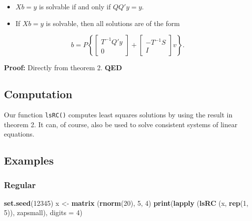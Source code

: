 \documentclass[12pt,]{article}
\newenvironment{Shaded}{\begin{snugshade}}{\end{snugshade}}
\newcommand{\KeywordTok}[1]{\textcolor[rgb]{0.13,0.29,0.53}{\textbf{#1}}}
\newcommand{\DataTypeTok}[1]{\textcolor[rgb]{0.13,0.29,0.53}{#1}}
\newcommand{\DecValTok}[1]{\textcolor[rgb]{0.00,0.00,0.81}{#1}}
\newcommand{\StringTok}[1]{\textcolor[rgb]{0.31,0.60,0.02}{#1}}
\newcommand{\NormalTok}[1]{#1}
\providecommand{\tightlist}{%
  \setlength{\itemsep}{0pt}\setlength{\parskip}{0pt}}
\begin{document}
\begin{itemize}
\tightlist
\item
  \(Xb=y\) is solvable if and only if \(QQ'y=y\).
\item
  If \(Xb=y\) is solvable, then all solutions are of the form
\end{itemize}

\begin{equation}
b = P\left\{\begin{bmatrix}T^{-1}Q'y\\0\end{bmatrix}+\begin{bmatrix}-T^{-1}S\\I\end{bmatrix}v\right\}.\label{E:linear}
\end{equation}

\textbf{Proof:} Directly from theorem 2. \textbf{QED}

\subsection{Computation}\label{computation-1}

Our function \texttt{lsRC()} computes least squares solutions by using
the result in theorem 2. It can, of course, also be used to solve
consistent systems of linear equations.

\subsection{Examples}\label{examples-1}

\subsubsection{Regular}\label{regular-1}

\begin{Shaded}
\begin{Highlighting}[]
\KeywordTok{set.seed}\NormalTok{(}\DecValTok{12345}\NormalTok{)}
\NormalTok{x <-}\StringTok{ }\KeywordTok{matrix}\NormalTok{ (}\KeywordTok{rnorm}\NormalTok{(}\DecValTok{20}\NormalTok{), }\DecValTok{5}\NormalTok{, }\DecValTok{4}\NormalTok{)}
\KeywordTok{print}\NormalTok{(}\KeywordTok{lapply}\NormalTok{ (}\KeywordTok{lsRC}\NormalTok{ (x, }\KeywordTok{rep}\NormalTok{(}\DecValTok{1}\NormalTok{, }\DecValTok{5}\NormalTok{)), zapsmall), }\DataTypeTok{digits =} \DecValTok{4}\NormalTok{)}
\end{Highlighting}
\end{Shaded}
\end{document}
